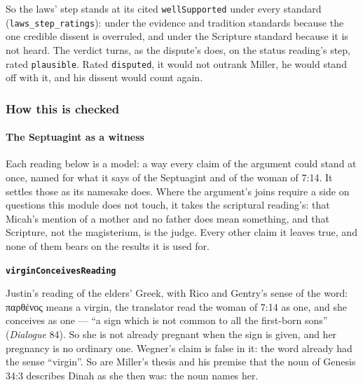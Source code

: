 \documentclass[11pt]{article}
\begin{document}
So the laws’ step stands at its cited \texttt{well\allowbreak{}Supported} under every standard (\texttt{laws\_\allowbreak{}step\_\allowbreak{}ratings}): under the evidence and tradition standards because the one credible dissent is overruled, and under the Scripture standard because it is not heard. The verdict turns, as the dispute’s does, on the status reading’s step, rated \texttt{plausible}. Rated \texttt{disputed}, it would not outrank Miller, he would stand off with it, and his dissent would count again.

\subsubsection*{How this is checked}
\paragraph*{The Septuagint as a witness}
\leavevmode\par\nobreak
Each reading below is a model: a way every claim of the argument could stand at once, named for what it says of the Septuagint and of the woman of 7:14. It settles those as its namesake does. Where the argument’s joins require a side on questions this module does not touch, it takes the scriptural reading’s: that Micah’s mention of a mother and no father does mean something, and that Scripture, not the magisterium, is the judge. Every other claim it leaves true, and none of them bears on the results it is used for.

\par\medskip\noindent\textbf{\texttt{virgin\allowbreak{}Conceives\allowbreak{}Reading}}\par\nobreak\noindent
Justin’s reading of the elders’ Greek, with Rico and Gentry’s sense of the word: παρθένος means a virgin, the translator read the woman of 7:14 as one, and she conceives as one — “a sign which is not common to all the first-born sons” (\emph{Dialogue} 84). So she is not already pregnant when the sign is given, and her pregnancy is no ordinary one. Wegner’s claim is false in it: the word already had the sense “virgin”. So are Miller’s thesis and his premise that the noun of Genesis 34:3 describes Dinah as she then was: the noun names her.
\end{document}

